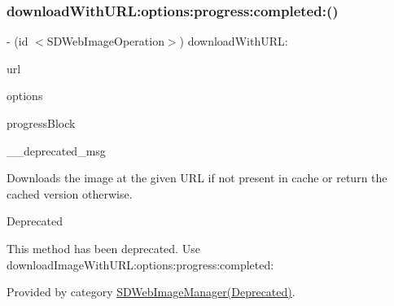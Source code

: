 \mbox{\label{interface_s_d_web_image_manager_a6ed93377fa34b44c02bce84279529dad}} 
\subsubsection{\texorpdfstring{download\+With\+U\+R\+L\+:options\+:progress\+:completed\+:()}{downloadWithURL:options:progress:completed:()}\hspace{0.1cm}{\footnotesize\ttfamily [3/3]}}
{\footnotesize\ttfamily -\/ (id $<$S\+D\+Web\+Image\+Operation$>$) download\+With\+U\+R\+L\+: \begin{DoxyParamCaption}\item[{(N\+S\+U\+RL $\ast$)}]{url }\item[{options:(S\+D\+Web\+Image\+Options)}]{options }\item[{progress:(S\+D\+Web\+Image\+Downloader\+Progress\+Block)}]{progress\+Block }\item[{completed:(\char`\"{}Method deprecated. Use \`{}\mbox{\hyperlink{interface_s_d_web_image_manager_ab094c361edd5ff886cbf484892e688be}{download\+Image\+With\+U\+R\+L\+:options\+:progress\+:completed\+:}}\`{}\char`\"{})}]{\+\_\+\+\_\+deprecated\+\_\+msg }\end{DoxyParamCaption}}

Downloads the image at the given U\+RL if not present in cache or return the cached version otherwise.

\begin{DoxyRefDesc}{Deprecated}
\item[\mbox{\hyperlink{deprecated__deprecated000033}{Deprecated}}]This method has been deprecated. Use {\ttfamily download\+Image\+With\+U\+R\+L\+:options\+:progress\+:completed\+:} \end{DoxyRefDesc}


Provided by category \mbox{\hyperlink{category_s_d_web_image_manager_07_deprecated_08_a6ed93377fa34b44c02bce84279529dad}{S\+D\+Web\+Image\+Manager(\+Deprecated)}}.

\mbox{\label{interface_s_d_web_image_manager_afc97641bfb1b30b1a262462a12c56c46}} 
